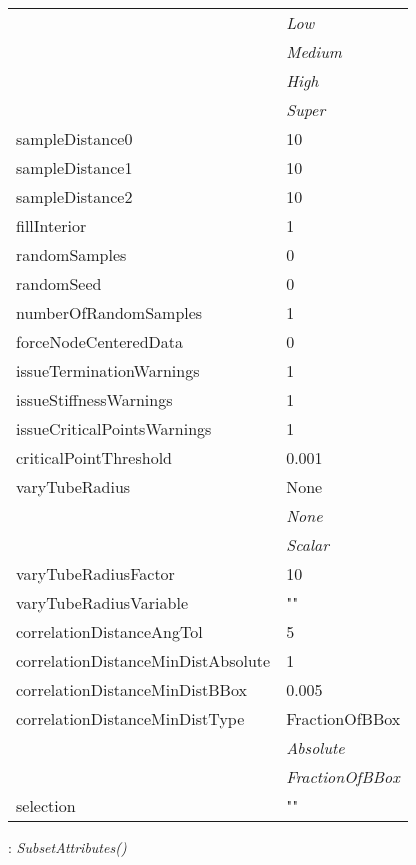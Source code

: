 \documentclass[10pt,a4paper]{report}
\begin{document}
\begin{longtable}{ll}
 & {\it  Low} \\
 & {\it  Medium} \\
 & {\it  High} \\
 & {\it  Super} \\
sampleDistance0  &  10 \\
sampleDistance1  &  10 \\
sampleDistance2  &  10 \\
fillInterior  &  1 \\
randomSamples  &  0 \\
randomSeed  &  0 \\
numberOfRandomSamples  &  1 \\
forceNodeCenteredData  &  0 \\
issueTerminationWarnings  &  1 \\
issueStiffnessWarnings  &  1 \\
issueCriticalPointsWarnings  &  1 \\
criticalPointThreshold  &  0.001 \\
varyTubeRadius  &  None   \\
 & {\it  None} \\
 & {\it  Scalar} \\
varyTubeRadiusFactor  &  10 \\
varyTubeRadiusVariable  &  "" \\
correlationDistanceAngTol  &  5 \\
correlationDistanceMinDistAbsolute  &  1 \\
correlationDistanceMinDistBBox  &  0.005 \\
correlationDistanceMinDistType  &  FractionOfBBox   \\
 & {\it  Absolute} \\
 & {\it  FractionOfBBox} \\
selection  &  "" \\
\end{longtable}

\newpage

{}
: {\it SubsetAttributes() }\\[-3mm]
\end{document}
